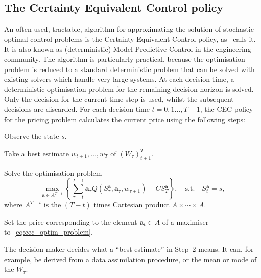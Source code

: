 \documentclass[main.tex]{subfiles}
\begin{document}
\subsection{The Certainty Equivalent Control policy}
An often-used, tractable, algorithm for approximating the solution of
stochastic optimal control
problems is the Certainty Equivalent Control policy,
as~\citet{bertsekas2005dynamic} calls it.
It is also known as (deterministic) Model
Predictive Control in the engineering community.
The algorithm is particularly practical, because the optimisation
problem is reduced to a standard deterministic problem that can
be solved with existing solvers which
handle very large systems.
At each decision time, a deterministic optimisation problem for the
remaining decision horizon is solved. Only the decision for the
current time step is
used, whilst the subsequent decisions are discarded.
For each decision time $t=0,1\dots,T-1$, the CEC policy for the pricing
problem calculates the current price using the following steps:
\begin{enumerate}
  \begin{samepage}
  \item Observe the state $s$.
  \item Take a best estimate $w_{t+1},\dots,w_T$ of ${(W_\tau)}_{t+1}^T$.
  \item Solve the optimisation problem
    \begin{equation}\label{eq:cec_optim_problem}
      \max_{\mathbf a\in A^{T-t}}\left\{\sum_{\tau=t}^{T-1}\mathbf
        a_\tau Q(S_\tau^{\mathbf a},\mathbf
        a_\tau,w_{\tau+1})-CS_T^{\mathbf a}\right\},
      \quad \text{s.t.}\quad S_t^{\mathbf a}=s,
    \end{equation}
    where $A^{T-t}$ is the $(T-t)$ times Cartesian product $A\times
    \cdots\times A$.
  \item Set the price corresponding to the element
    $\mathbf{a}_t\in A$ of a maximiser to~\eqref{eq:cec_optim_problem}.
  \end{samepage}
\end{enumerate}
The decision maker decides what a ``best estimate'' in Step~2
means. It can, for example, be
derived from a data assimilation procedure, or the
mean or mode of the $W_\tau$.
\end{document}
